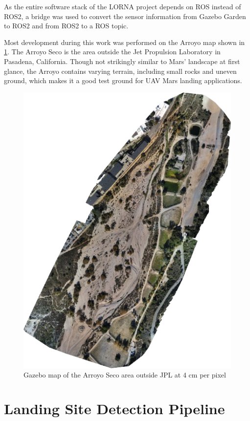 As the entire software stack of the LORNA project depends on ROS instead of ROS2, a bridge was used to convert the sensor information from Gazebo Garden to ROS2 and from ROS2 to a ROS topic.

Most development during this work was performed on the Arroyo map shown in \cref{fig:arroyo_intro}. The Arroyo Seco is the area outside the Jet Propulsion Laboratory in Pasadena, California. Though not strikingly similar to Mars' landscape at first glance, the Arroyo contains varying terrain, including small rocks and uneven ground, which makes it a good test ground for UAV Mars landing applications.

\begin{figure}[ht!]
    \centering
    \includegraphics[scale=0.45]{images/evaluation/arroyo.png}
    \caption{Gazebo map of the Arroyo Seco area outside JPL at 4 cm per pixel}
    \label{fig:arroyo_intro}
\end{figure}


\section{Landing Site Detection Pipeline}\label{sec:setup:LSP}

